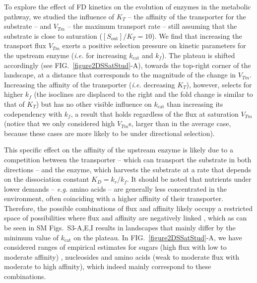 \documentclass[11pt,onecolumn]{article}
\begin{document}
To explore the effect of FD kinetics on the evolution of enzymes in the metabolic pathway, we studied the influence of  $K_T$ -- the affinity of the transporter for the substrate -- and $V_{Tm}$ -- the maximum transport rate -- still assuming that the substrate is close to saturation ($[S_\text{out}]/K_T=10$). We find that increasing the transport flux $V_{Tm}$ exerts a positive selection pressure on kinetic parameters for the upstream enzyme (\textit{i.e.} for increasing $k_\text{cat}$ and $k_f$). The plateau is shifted accordingly (see FIG.~\ref{figure2DSSatStud}-A), towards the top-right corner of the landscape, at a distance that corresponds to the magnitude of the change in $V_{Tm}$. Increasing the affinity of the transporter (\textit{i.e.} decreasing $K_T$), however, selects for higher $k_{f}$ (the isoclines are displaced to the right and the fold change is similar to that of $K_T$) but has no other visible influence on $k_\text{cat}$ than increasing its codependency with $k_f$, a result that holds regardless of the flux at saturation $V_{Tm}$ (notice that we only considered high $V_{Tm}$s, larger than in the average case, because these cases are more likely to be under directional selection). 

This specific effect on the affinity of the upstream enzyme is likely due to a competition between the transporter -- which can transport the substrate in both directions -- and the enzyme, which harvests the substrate at a rate that depends on the dissociation constant $K_D=k_r/k_f$. It should be noted that nutrients under lower demands -- \textit{e.g.} amino acids -- are generally less concentrated in the environment, often coinciding with a higher affinity of their transporter. Therefore, the possible combinations of flux and affinity likely occupy a restricted space of possibilities where flux and affinity are negatively linked \citep{Gudelj10,Bosdriesz18}, which as can be seen in SM Figs.~S3-A,E,I results in landscapes that mainly differ by the minimum value of $k_\text{cat}$ on the plateau. In FIG.~\ref{figure2DSSatStud}-A, we have considered ranges of empirical estimates for sugars (high flux with low to moderate affinity) \citep{Stein86d,Maier02}, nucleosides \citep{Griffith96} and amino acids \citep{Stein86d,Zampieri2019} (weak to moderate flux with moderate to high affinity), which indeed mainly correspond to these combinations.   
\end{document}
